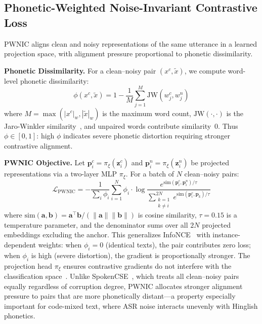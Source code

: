 \documentclass[conference]{IEEEtran}
\begin{document}
\subsection{Phonetic-Weighted Noise-Invariant Contrastive Loss}
\label{sec:pwnic}

PWNIC aligns clean and noisy representations of the same utterance in a learned projection space, with alignment pressure proportional to phonetic dissimilarity.

\textbf{Phonetic Dissimilarity.} For a clean--noisy pair $(x^c, \tilde{x})$, we compute word-level phonetic dissimilarity:
\begin{equation}
    \phi(x^c, \tilde{x}) = 1 - \frac{1}{M} \sum_{j=1}^{M} \text{JW}(w_j^c, w_j^n)
    \label{eq:phi}
\end{equation}
where $M = \max(|x^c|_w, |\tilde{x}|_w)$ is the maximum word count, $\text{JW}(\cdot, \cdot)$ is the Jaro-Winkler similarity~\cite{winkler1990string}, and unpaired words contribute similarity~0. Thus $\phi \in [0, 1]$: high $\phi$ indicates severe phonetic distortion requiring stronger contrastive alignment.

\textbf{PWNIC Objective.} Let $\mathbf{p}_i^c = \pi_\xi(\mathbf{z}_i^c)$ and $\mathbf{p}_i^n = \pi_\xi(\mathbf{z}_i^n)$ be projected representations via a two-layer MLP $\pi_\xi$. For a batch of $N$ clean--noisy pairs:
\begin{equation}
\mathcal{L}_{\text{PWNIC}} = -\frac{1}{\sum_{i} \phi_i}
\sum_{i=1}^{N} \phi_i \cdot
\log \frac{e^{\text{sim}(\mathbf{p}_i^c, \mathbf{p}_i^n) / \tau}}
          {\displaystyle\sum_{\substack{k=1 \\ k \neq i}}^{2N}
           e^{\text{sim}(\mathbf{p}_i^c, \mathbf{p}_k) / \tau}}
\label{eq:pwnic}
\end{equation}
where $\text{sim}(\mathbf{a}, \mathbf{b}) = \mathbf{a}^\top \mathbf{b} / (\|\mathbf{a}\| \|\mathbf{b}\|)$ is cosine similarity, $\tau = 0.15$ is a temperature parameter, and the denominator sums over all $2N$ projected embeddings excluding the anchor. This generalizes InfoNCE~\cite{oord2018representation} with instance-dependent weights: when $\phi_i = 0$ (identical texts), the pair contributes zero loss; when $\phi_i$ is high (severe distortion), the gradient is proportionally stronger. The projection head $\pi_\xi$ ensures contrastive gradients do not interfere with the classification space~\cite{chen2020simclr}. Unlike SpokenCSE~\cite{chang2022spokencse}, which treats all clean--noisy pairs equally regardless of corruption degree, PWNIC allocates stronger alignment pressure to pairs that are more phonetically distant---a property especially important for code-mixed text, where ASR noise interacts unevenly with Hinglish phonetics.
\end{document}
